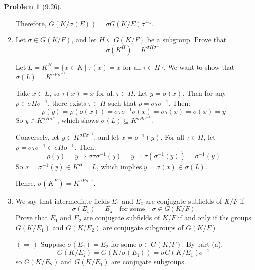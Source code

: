 \documentclass[12pt]{article}
\theoremstyle{definition}
\newtheorem{problem}{Problem}
\begin{document}
\begin{problem}[9.26]
\begin{enumerate}[label=(\alph*)]
\begin{solution}
            Therefore, $G(K/\sigma(E)) = \sigma G(K/E)\sigma^{-1}$.
        \end{solution}

        \item Let $\sigma \in G(K/F)$, and let $H \subseteq G(K/F)$ be a subgroup. Prove that
              \[
                    \sigma(K^H) = K^{\sigma H \sigma^{-1}}
              \]
        
        \begin{solution}
            Let $L = K^H = \{x \in K \mid \tau(x) = x \text{ for all } \tau \in H\}$. We want to show that $\sigma(L) = K^{\sigma H \sigma^{-1}}$.

            Take $x \in L$, so $\tau(x) = x$ for all $\tau \in H$. Let $y = \sigma(x)$. Then for any $\rho \in \sigma H \sigma^{-1}$, there exists $\tau \in H$ such that $\rho = \sigma \tau \sigma^{-1}$. Then:
            \[
            \rho(y) = \rho(\sigma(x)) = \sigma \tau \sigma^{-1} \sigma(x) = \sigma \tau(x) = \sigma(x) = y
            \]
            So $y \in K^{\sigma H \sigma^{-1}}$, which shows $\sigma(L) \subseteq K^{\sigma H \sigma^{-1}}$.

            Conversely, let $y \in K^{\sigma H \sigma^{-1}}$, and let $x = \sigma^{-1}(y)$. For all $\tau \in H$, let $\rho = \sigma \tau \sigma^{-1} \in \sigma H \sigma^{-1}$. Then:
            \[
            \rho(y) = y \Rightarrow \sigma \tau \sigma^{-1}(y) = y \Rightarrow \tau(\sigma^{-1}(y)) = \sigma^{-1}(y)
            \]
            So $x = \sigma^{-1}(y) \in K^H = L$, which implies $y = \sigma(x) \in \sigma(L)$.

            Hence, $\sigma(K^H) = K^{\sigma H \sigma^{-1}}$.
        \end{solution}

        \item We say that intermediate fields $E_1$ and $E_2$ are conjugate subfields of $K/F$ if
              \[
                    \sigma(E_1) = E_2 \quad \text{for some} \quad \sigma \in G(K/F)
              \]
              Prove that $E_1$ and $E_2$ are conjugate subfields of $K/F$ if and only if the groups $G(K/E_1)$ and $G(K/E_2)$ are conjugate subgroups of $G(K/F)$.
        
        \begin{solution}
            $(\Rightarrow)$ Suppose $\sigma(E_1) = E_2$ for some $\sigma \in G(K/F)$. By part (a),
            \[
            G(K/E_2) = G(K/\sigma(E_1)) = \sigma G(K/E_1) \sigma^{-1}
            \]
            so $G(K/E_2)$ and $G(K/E_1)$ are conjugate subgroups.


\end{solution}
\end{enumerate}
\end{problem}
\end{document}
